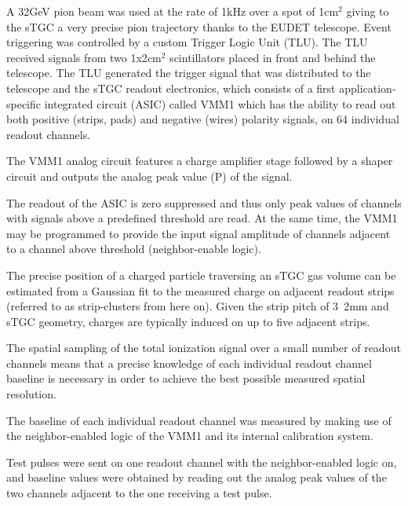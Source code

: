 A \unit{32}{GeV} pion beam was used at the rate of \unit{1}{kHz} over a spot of \unit{1}{cm$^2$} giving to the sTGC a
very precise pion trajectory thanks to the EUDET telescope.  Event triggering was controlled by a custom Trigger Logic
Unit (TLU). The TLU received signals from two \unit{1x2}{cm$^2$} scintillators placed in front and behind the telescope.
The TLU generated the trigger signal that was distributed to the telescope and the sTGC readout electronics, which
consists of a first application-specific integrated circuit (ASIC) called VMM1 which has the ability to read out both
positive (strips, pads) and negative (wires) polarity signals, on 64 individual readout channels.\par
	
The VMM1 analog circuit features a charge amplifier stage followed by a shaper circuit and outputs the analog peak value
(P) of the signal.\par
	
The readout of the ASIC is zero suppressed and thus only peak values of channels with signals above a predefined
threshold are read.  At the same time, the VMM1 may be programmed to provide the input signal amplitude of channels
adjacent to a channel above threshold (neighbor-enable logic).\par
	
The precise position of a charged particle traversing an sTGC gas volume can be estimated from a Gaussian fit to the
measured charge on adjacent readout strips (referred to as strip-clusters from here on). Given the strip pitch of
\unit{3.2}{mm} and sTGC geometry, charges are typically induced on up to five adjacent strips. \par

The spatial sampling of the total ionization signal over a small number of readout channels means that a precise
knowledge of each individual readout channel baseline is necessary in order to achieve the best possible measured
spatial resolution. \par

The baseline of each individual readout channel was measured by making use of the neighbor-enabled logic of the VMM1 and
its internal calibration system. \par

Test pulses were sent on one readout channel with the neighbor-enabled logic on, and baseline values were obtained by
reading out the analog peak values of the two channels adjacent to the one receiving a test pulse.\par
	
